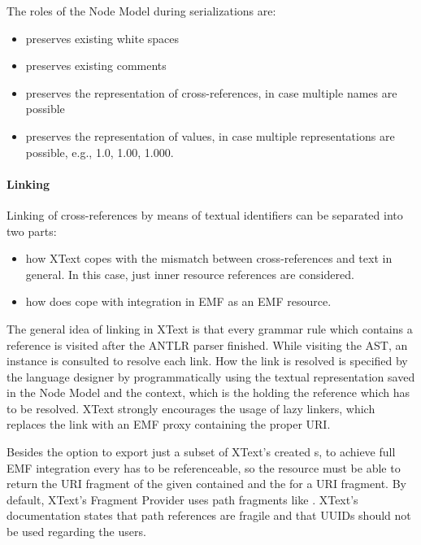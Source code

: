 The roles of the Node Model during serializations are:
\begin{itemize}
	\item preserves existing white spaces
	\item preserves existing comments
	\item preserves the representation of cross-references, in case multiple names are possible
	\item preserves the representation of values, in case multiple representations are possible, e.g., 1.0, 1.00, 1.000.
\end{itemize}

\paragraph{Linking}
\label{sec:xtextarch:Linking}
Linking of cross-references by means of textual identifiers can be separated into two parts:
\begin{itemize}
	\item how XText copes with the mismatch between cross-references and text in general. In this case, just inner resource references are considered. 
	\item how does  cope with integration in EMF as an EMF resource.
\end{itemize}
The general idea of linking in XText is that every grammar rule which contains a reference is visited after the ANTLR parser finished. While visiting the AST, an  instance is consulted to resolve each link. How the link is resolved is specified by the language designer by programmatically using the textual representation saved in the Node Model and the context, which is the  holding the reference which has to be resolved. XText strongly encourages the usage of lazy linkers, which replaces the link with an EMF proxy containing the proper URI.

Besides the option to export just a subset of XText's created s, to achieve full EMF integration every  has to be referenceable, so the resource must be able to return the URI fragment of the given contained  and the  for a URI fragment. By default, XText's Fragment Provider uses path fragments like . XText's documentation states that path references are fragile and that UUIDs should not be used regarding the users. 

